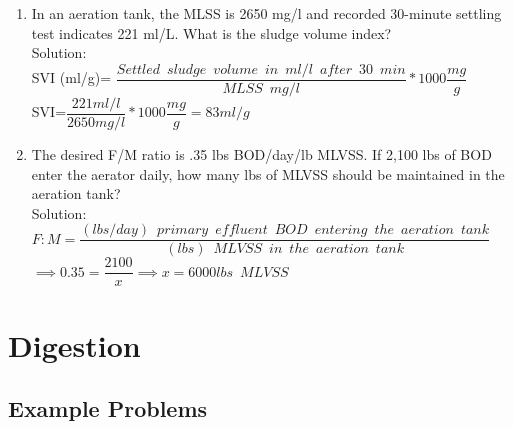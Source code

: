 \documentclass{article}
\begin{document}
\begin{enumerate}
\item In an aeration tank, the MLSS is 2650 mg/l and recorded 30-minute settling test indicates 221 ml/L.  What is the sludge volume index?\\
\vspace{0.3cm}
Solution:\\
SVI (ml/g)= $\dfrac{Settled \enspace sludge \enspace volume \enspace in \enspace ml/l \enspace after \enspace 30 \enspace min}{MLSS \enspace mg/l}*1000 \dfrac{mg}{g}$\\
\vspace{0.5cm}
SVI=$\dfrac{221ml/l}{2650mg/l}*1000\dfrac{mg}{g}=\boxed{83ml/g}$
\item The desired F/M ratio is .35 lbs BOD/day/lb MLVSS. If 2,100 lbs of BOD enter the aerator daily, how many lbs of MLVSS should be maintained in the aeration tank?\\
Solution:\\
$F:M=\dfrac{(lbs/day) \enspace primary \enspace effluent  \enspace BOD \enspace entering \enspace the  \enspace aeration \enspace tank}{(lbs) \enspace MLVSS \enspace in \enspace the  \enspace aeration \enspace tank}$\\
\vspace{0.3cm}
$\implies 0.35=\dfrac{2100}{x}\implies x = \boxed{6000lbs \enspace MLVSS}$\\

\end{enumerate}






\newpage

\section{Digestion}

\subsection{Example Problems} 
\end{document}
